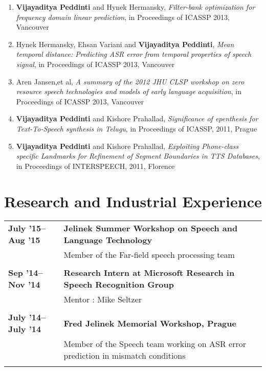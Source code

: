 \documentclass[margin,line,pifont,palatino,courier]{res}
\begin{document}
\begin{resume}
\begin{enumerate}
\item \textbf{Vijayaditya Peddinti} and Hynek Hermansky,
\textit{Filter-bank optimization for frequency domain linear prediction}, in Proceedings of ICASSP 2013, Vancouver

\item Hynek Hermansky, Ehsan Variani and \textbf{Vijayaditya Peddinti},
\textit{Mean temporal distance: Predicting ASR error from temporal properties of speech signal}, in Proceedings of ICASSP 2013, Vancouver

\item Aren Jansen,et al,
\textit{A summary of the 2012 JHU CLSP workshop on zero resource speech technologies and models of early language acquisition}, in Proceedings of ICASSP 2013, Vancouver

\item \textbf{Vijayaditya Peddinti} and Kishore Prahallad,
\textit{Significance of epenthesis for Text-To-Speech synthesis in Telugu}, in Proceedings of ICASSP, 2011, Prague

\item \textbf{Vijayaditya Peddinti} and Kishore Prahallad,
\textit{Exploiting Phone-class specific Landmarks for Refinement of Segment Boundaries in TTS Databases}, in Proceedings of INTERSPEECH, 2011, Florence

\end{enumerate}
\section{\sc Research and Industrial Experience}

\begin{longtable}{@{}p{1.2in}p{3.8in}}

\textbf{July '15--Aug '15} & \textbf{Jelinek Summer Workshop on Speech and Language Technology} \\
& Member of the Far-field speech processing team \\
&\\

\textbf{Sep '14--Nov '14} & \textbf{Research Intern at Microsoft Research in Speech Recognition Group} \\
& Mentor : Mike Seltzer \\
&\\

\textbf{July '14--July '14} & \textbf{Fred Jelinek Memorial Workshop, Prague} \\
& Member of the Speech team working on ASR error prediction in mismatch conditions \\
&\\


\end{longtable}
\end{resume}
\end{document}
